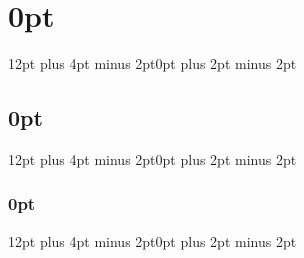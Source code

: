 \usepackage{fontspec}
\setmainfont{Times New Roman} 
\setsansfont{Trebuchet MS} 
\setmonofont{Inconsolata}

\newcommand\halamanKosong{
    \newpage
    \vspace*{\fill}
    \begin{center}
        \textit{Halaman ini sengaja dikosongkan}
    \end{center}
    \vspace{\fill}
    \clearpage
}

\usepackage{indentfirst}
\setlength{\parindent}{2em} 

\usepackage{titlesec}

\titlespacing\section{0pt}{12pt plus 4pt minus 2pt}{0pt plus 2pt minus 2pt}
\titlespacing\subsection{0pt}{12pt plus 4pt minus 2pt}{0pt plus 2pt minus 2pt}
\titlespacing\subsubsection{0pt}{12pt plus 4pt minus 2pt}{0pt plus 2pt minus 2pt}

\usepackage{fancyhdr}
    \fancyhead{}
    \fancyfoot{}
    \setlength{\headheight}{15pt}
    \setlength{\headsep}{12pt}
    \setlength{\footskip}{30pt}
    \renewcommand{\headrulewidth}{0pt}
    \renewcommand{\footrulewidth}{0pt}
    
